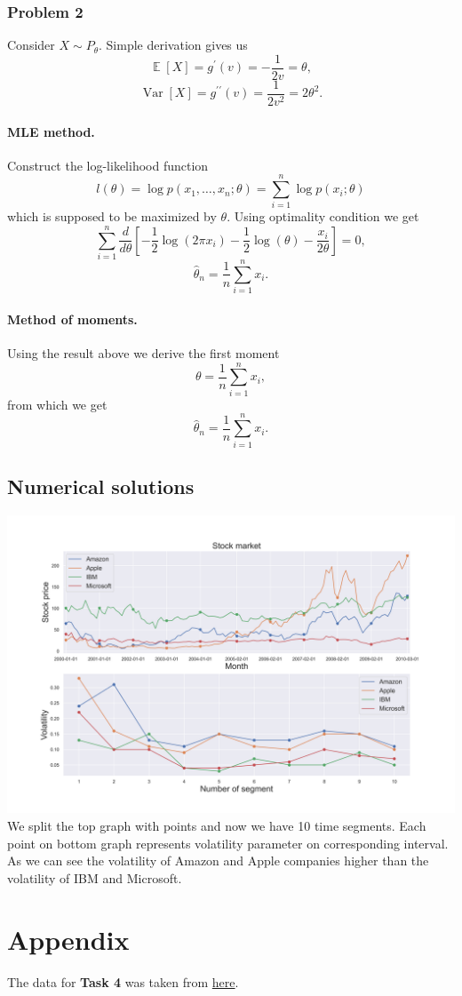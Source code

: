 \documentclass[a4paper, 12pt]{article}
\DeclareMathOperator*{\E}{\mathbb{E}}
\DeclareMathOperator*{\Var}{\text{Var}}
\begin{document}
\subsubsection{Problem 2}
Consider $X \sim P_{\theta}.$ Simple derivation gives us
$$
\E [X] = g^{\prime} (v) = -\dfrac{1}{2  v} = \theta,
$$
$$
\Var [X] = g^{\prime \prime} (v) = \dfrac{1}{2 v^2} = 2 \theta^2.
$$ 
\paragraph{MLE method.} Construct the log-likelihood function
$$
l(\theta) = \log p(x_1, \ldots, x_n; \theta) =  \sum \limits_{i=1}^n \log p(x_i; \theta)
$$
which is supposed to be maximized by $\theta.$
Using optimality condition we get
$$
\sum \limits_{i=1}^n \dfrac{d}{d\theta} \left[-\dfrac{1}{2}\log (2 \pi x_i) - \dfrac{1}{2} \log (\theta) - \dfrac{x_i}{2\theta} \right]  = 0,
$$
$$
\hat{\theta}_n = \dfrac{1}{n} \sum \limits_{i=1}^n x_i.
$$

\paragraph{Method of moments.} Using the result above we derive the first moment
$$
\theta =  \dfrac{1}{n} \sum \limits_{i=1}^n x_i,
$$
from which we get
$$
\hat{\theta}_n = \dfrac{1}{n} \sum \limits_{i=1}^n x_i.
$$

\subsection{Numerical solutions}
\includegraphics[width=\textwidth]{Images/Task4.png}
We split the top graph with points and now we have 10 time segments. Each point on bottom graph represents volatility parameter on corresponding interval. As we can see the volatility of Amazon and Apple companies higher than  the volatility of IBM and Microsoft.

\section{Appendix}
The data for \textbf{Task 4} was taken from \href{https://github.com/vega/datalib/blob/master/test/data/stocks.csv}{here}.
\end{document}
